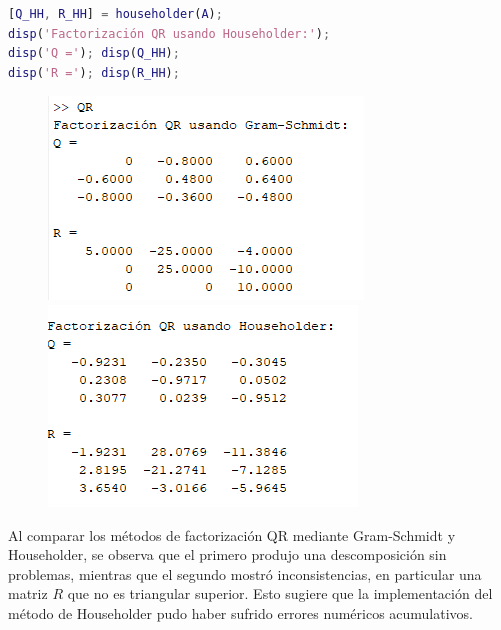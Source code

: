 \begin{homeworkProblem}
\begin{itemize}
\begin{solucion}
\begin{lstlisting}[language = matlab]
[Q_HH, R_HH] = householder(A);
disp('Factorización QR usando Householder:');
disp('Q ='); disp(Q_HH);
disp('R ='); disp(R_HH);
\end{lstlisting}
\begin{figure}[H]  
    \centering
    \begin{minipage}{0.49\textwidth}
        \centering
        \includegraphics[width=\textwidth]{Figures/qr gs.png}
    \end{minipage}
    \begin{minipage}{0.49\textwidth}
        \centering
        \includegraphics[width=\textwidth]{Figures/qr hh.png}
    \end{minipage}
\end{figure}


Al comparar los métodos de factorización QR mediante Gram-Schmidt y Householder, se observa que el primero produjo una descomposición sin problemas, mientras que el segundo mostró inconsistencias, en particular una matriz \( R \) que no es triangular superior. Esto sugiere que la implementación del método de Householder pudo haber sufrido errores numéricos acumulativos.


\end{solucion}
\end{itemize}
\end{homeworkProblem}
